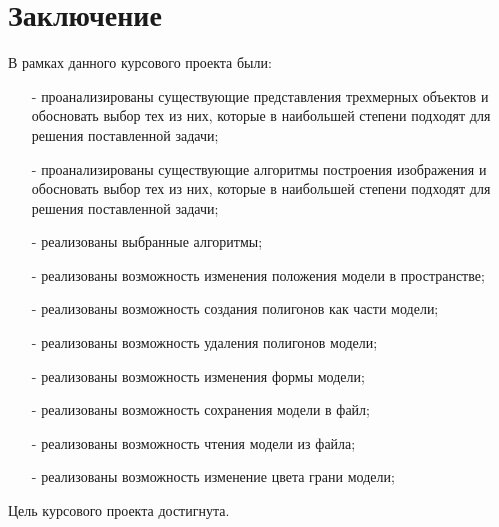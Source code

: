 \chapter*{Заключение}


В рамках данного курсового проекта были:
\begin{itemize}
	\item[-] проанализированы существующие представления трехмерных объектов и обосновать выбор тех из них, которые в наибольшей степени подходят для решения поставленной задачи;
	\item[-] проанализированы существующие алгоритмы построения изображения и обосновать выбор тех из них, которые в наибольшей степени подходят для решения поставленной задачи;
	\item[-] реализованы выбранные алгоритмы;
	\item[-] реализованы возможность изменения положения модели в пространстве;
	\item[-] реализованы возможность создания полигонов как части модели;
	\item[-] реализованы возможность удаления полигонов модели;
	\item[-] реализованы возможность изменения формы модели;
	\item[-] реализованы возможность сохранения модели в файл;
	\item[-] реализованы возможность чтения модели из файла;
	\item[-] реализованы возможность изменение цвета грани модели;
\end{itemize}

Цель курсового проекта достигнута.